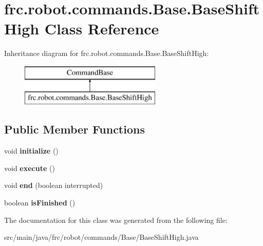 \hypertarget{classfrc_1_1robot_1_1commands_1_1_base_1_1_base_shift_high}{}\section{frc.\+robot.\+commands.\+Base.\+Base\+Shift\+High Class Reference}
\label{classfrc_1_1robot_1_1commands_1_1_base_1_1_base_shift_high}
Inheritance diagram for frc.\+robot.\+commands.\+Base.\+Base\+Shift\+High\+:\begin{figure}[H]
\begin{center}
\leavevmode
\includegraphics[height=2.000000cm]{classfrc_1_1robot_1_1commands_1_1_base_1_1_base_shift_high}
\end{center}
\end{figure}
\subsection*{Public Member Functions}
\begin{DoxyCompactItemize}
\item 
\mbox{\label{classfrc_1_1robot_1_1commands_1_1_base_1_1_base_shift_high_a8c5593ba2e16eacc22a1ebd3183cec51}} 
void {\bfseries initialize} ()
\item 
\mbox{\label{classfrc_1_1robot_1_1commands_1_1_base_1_1_base_shift_high_adca0a1e38ec28835c8a908de63a57bfe}} 
void {\bfseries execute} ()
\item 
\mbox{\label{classfrc_1_1robot_1_1commands_1_1_base_1_1_base_shift_high_a912957fbbc0cdff5d304d57929a04797}} 
void {\bfseries end} (boolean interrupted)
\item 
\mbox{\label{classfrc_1_1robot_1_1commands_1_1_base_1_1_base_shift_high_a4d227fd5bded401d34e599d860b5cfda}} 
boolean {\bfseries is\+Finished} ()
\end{DoxyCompactItemize}


The documentation for this class was generated from the following file\+:\begin{DoxyCompactItemize}
\item 
src/main/java/frc/robot/commands/\+Base/Base\+Shift\+High.\+java\end{DoxyCompactItemize}
